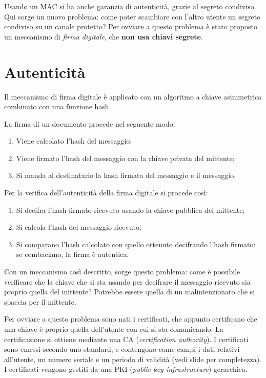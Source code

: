 \documentclass[a4paper, 11pt]{article}
\begin{document}
\begin{multicols}{2}
		Usando un MAC si ha anche garanzia di autenticità, grazie al segreto condiviso. Qui sorge un nuovo problema: come poter scambiare con l'altro utente un segreto condiviso su un canale protetto? Per ovviare a questo problema è stato proposto un meccanismo di \textit{firma digitale}, che \textbf{non usa chiavi segrete}.
		
		\section{Autenticità}
		Il meccanismo di firma digitale è applicato con un algoritmo a chiave asimmetrica combinato con una funzione hash.
		
		La firma di un documento procede nel seguente modo:
		\begin{enumerate}
			\item Viene calcolato l'hash del messaggio;
			\item Viene firmato l'hash del messaggio con la chiave privata del mittente;
			\item Si manda al destinatario la hash firmata del messaggio e il messaggio.
		\end{enumerate}
	
		Per la verifica dell'autenticità della firma digitale si procede così:
		\begin{enumerate}
			\item Si decifra l'hash firmato ricevuto usando la chiave pubblica del mittente;
			\item Si calcola l'hash del messaggio ricevuto;
			\item Si comparano l'hash calcolato con quello ottenuto decifrando l'hash firmato: se combaciano, la firma è autentica.
		\end{enumerate}
	
		Con un meccanismo così descritto, sorge questo problema: come è possibile verificare che la chiave che si sta usando per decifrare il messaggio ricevuto sia proprio quella del mittente? Potrebbe essere quella di un malintenzionato che si spaccia per il mittente.
		
		Per ovviare a questo problema sono nati i certificati, che appunto certificano che una chiave è proprio quella dell'utente con cui si sta comunicando. La certificazione si ottiene mediante una CA (\textit{certification authority}). I certificati sono emessi secondo uno standard, e contengono come campi i dati relativi all'utente, un numero seriale e un periodo di validità (vedi slide per completezza). I certificati vengono gestiti da una PKI (\textit{public key infrastructure}) gerarchica.
		

\end{multicols}
\end{document}
